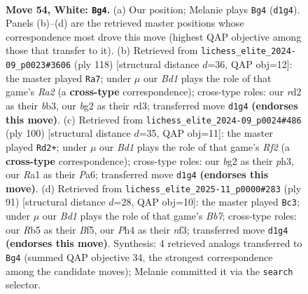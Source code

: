 \documentclass[11pt]{article}
\begin{document}
\clearpage

\begin{figure}[p]\centering
\begin{subfigure}{0.46\textwidth}\centering
\resizebox{\linewidth}{!}{%
\newchessgame
\chessboard[
  setfen={4r3/5pk1/6p1/1R6/7P/1P6/2Pr2b1/R2B2K1 w - - 3 54},
  showmover=false,
  pgfstyle=straightmove, color=movearrow, markmove={d1-g4}
]}
\caption{}
\end{subfigure}\hfill
\begin{subfigure}{0.46\textwidth}\centering
\resizebox{\linewidth}{!}{%
\newchessgame
\chessboard[
  setfen={8/6pk/5p2/8/5BP1/1b1rPP2/R4K2/8 w - - 6 60},
  showmover=false,
  pgfstyle=straightmove, color=movearrow, markmove={a2-a7}
]}
\caption{}
\end{subfigure}
\\[4pt]
\begin{subfigure}{0.46\textwidth}\centering
\resizebox{\linewidth}{!}{%
\newchessgame
\chessboard[
  setfen={8/7R/Pbpk4/8/1P3p2/2P2Prp/1K3R2/8 w - - 1 51},
  showmover=false,
  pgfstyle=straightmove, color=movearrow, markmove={f2-d2}
]}
\caption{}
\end{subfigure}\hfill
\begin{subfigure}{0.46\textwidth}\centering
\resizebox{\linewidth}{!}{%
\newchessgame
\chessboard[
  setfen={8/5Bp1/3k3p/5b2/1r6/5N1P/1b2R1P1/7K b - - 12 46},
  showmover=false,
  pgfstyle=straightmove, color=movearrow, markmove={b2-c3}
]}
\caption{}
\end{subfigure}
\caption{\textbf{Move 54, White: \texttt{Bg4}.} (a) Our position; Melanie plays \texttt{Bg4} (\texttt{d1g4}). Panels (b)--(d) are the retrieved master positions whose correspondence most drove this move (highest QAP objective among those that transfer to it). (b) Retrieved from \texttt{lichess\_elite\_2024-09\_p0023\#3606} (ply 118) [structural distance $d$=36, QAP obj=12]: the master played \texttt{Ra7}; under $\mu$ our \emph{Bd1} plays the role of that game's \emph{Ra2} (a \textbf{cross-type} correspondence); cross-type roles: our \emph{r}d2 as their \emph{b}b3, our \emph{b}g2 as their \emph{r}d3; transferred move \texttt{d1g4} \textbf{(endorses this move)}. (c) Retrieved from \texttt{lichess\_elite\_2024-09\_p0024\#486} (ply 100) [structural distance $d$=35, QAP obj=11]: the master played \texttt{Rd2+}; under $\mu$ our \emph{Bd1} plays the role of that game's \emph{Rf2} (a \textbf{cross-type} correspondence); cross-type roles: our \emph{b}g2 as their \emph{p}h3, our \emph{R}a1 as their \emph{P}a6; transferred move \texttt{d1g4} \textbf{(endorses this move)}. (d) Retrieved from \texttt{lichess\_elite\_2025-11\_p0000\#283} (ply 91) [structural distance $d$=28, QAP obj=10]: the master played \texttt{Bc3}; under $\mu$ our \emph{Bd1} plays the role of that game's \emph{Bb7}; cross-type roles: our \emph{R}b5 as their \emph{B}f5, our \emph{P}h4 as their \emph{n}f3; transferred move \texttt{d1g4} \textbf{(endorses this move)}. Synthesis: 4 retrieved analogs transferred to \texttt{Bg4} (summed QAP objective 34, the strongest correspondence among the candidate moves); Melanie committed it via the \texttt{search} selector.}
\label{fig:thought-m106}
\end{figure}
\end{document}
